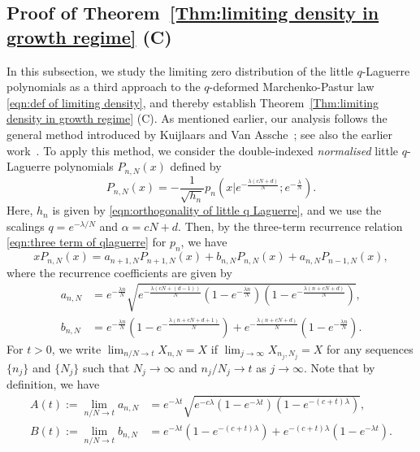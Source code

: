 \documentclass{amsart}
\theoremstyle{plain}
\theoremstyle{remark}
\numberwithin{equation}{section}
\begin{document}
\subsection{Proof of Theorem~\ref{Thm:limiting density in growth regime} (C)} \label{Subsec_Thm main (C)}

In this subsection, we study the limiting zero distribution of the little $q$-Laguerre polynomials as a third approach to the $q$-deformed Marchenko-Pastur law \eqref{eqn:def of limiting density}, and thereby establish Theorem~\ref{Thm:limiting density in growth regime} (C).
As mentioned earlier, our analysis follows the general method introduced by Kuijlaars and Van Assche~\cite{KV99}; see also the earlier work~\cite{VK91}. 
To apply this method, we consider the double-indexed \emph{normalised} little $q$-Laguerre polynomials $P_{n,N}(x)$ defined by
\begin{equation}
    P_{n,N}(x)=-\frac{1}{\sqrt{h_{n}}}p_{n}(x|e^{-\frac{\lambda (cN+d)}{N}};e^{-\frac{\lambda}{N}}).
\end{equation}
Here, $h_n$ is given by \eqref{eqn:orthogonality of little q Laguerre}, and we use the scalings $q=e^{-\lambda/N}$ and $\alpha=cN+d$.
Then, by the three-term recurrence relation \eqref{eqn:three term of qlaguerre} for $p_n$, we have
\begin{equation}
    xP_{n,N}(x)=a_{n+1,N}P_{n+1,N}(x)+b_{n,N}P_{n,N}(x)+a_{n,N}P_{n-1,N}(x), 
\end{equation}
where the recurrence coefficients are given by
\begin{equation}
\begin{split}
    a_{n,N}&=e^{-\frac{\lambda n}{N}}\sqrt{e^{-\frac{\lambda(cN+(d-1))}{N}}(1-e^{-\frac{\lambda n}{N}})(1-e^{-\frac{\lambda(n+cN+d)}{N}})}, 
    \\
    b_{n,N}&=e^{-\frac{\lambda n}{N}}(1-e^{-\frac{\lambda(n+cN+d+1)}{N}})+e^{-\frac{\lambda(n+cN+d)}{N}}(1-e^{-\frac{\lambda n}{N}}).
\end{split}
\end{equation}
For $t>0$, we write $\lim_{n/N\to t} X_{n,N} = X$ if $\lim_{j\to\infty} X_{n_j,N_j} = X$ for any sequences $\{n_j\}$ and $\{N_j\}$ such that $N_j \to \infty$ and $n_j/N_j \to t$ as $j \to \infty$.
Note that by definition, we have 
\begin{equation}
\begin{split}
    A(t):=\lim_{n/N\rightarrow t}a_{n,N}
    &=e^{-\lambda t}\sqrt{e^{-c\lambda}(1-e^{-\lambda t})(1-e^{-(c+t)\lambda})},\\
    B(t):=\lim_{n/N\rightarrow t}b_{n,N}
    &=e^{-\lambda t}(1-e^{-(c+t)\lambda})+e^{-(c+t)\lambda}(1-e^{-\lambda t}).
\end{split}
\end{equation}
\end{document}
